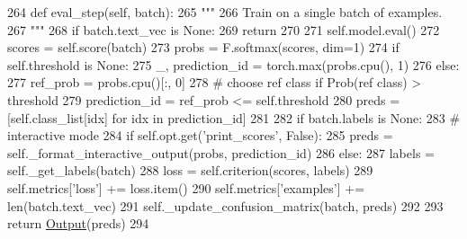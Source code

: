\begin{DoxyCode}
264     \textcolor{keyword}{def }eval\_step(self, batch):
265         \textcolor{stringliteral}{"""}
266 \textcolor{stringliteral}{        Train on a single batch of examples.}
267 \textcolor{stringliteral}{        """}
268         \textcolor{keywordflow}{if} batch.text\_vec \textcolor{keywordflow}{is} \textcolor{keywordtype}{None}:
269             \textcolor{keywordflow}{return}
270 
271         self.model.eval()
272         scores = self.score(batch)
273         probs = F.softmax(scores, dim=1)
274         \textcolor{keywordflow}{if} self.threshold \textcolor{keywordflow}{is} \textcolor{keywordtype}{None}:
275             \_, prediction\_id = torch.max(probs.cpu(), 1)
276         \textcolor{keywordflow}{else}:
277             ref\_prob = probs.cpu()[:, 0]
278             \textcolor{comment}{# choose ref class if Prob(ref class) > threshold}
279             prediction\_id = ref\_prob <= self.threshold
280         preds = [self.class\_list[idx] \textcolor{keywordflow}{for} idx \textcolor{keywordflow}{in} prediction\_id]
281 
282         \textcolor{keywordflow}{if} batch.labels \textcolor{keywordflow}{is} \textcolor{keywordtype}{None}:
283             \textcolor{comment}{# interactive mode}
284             \textcolor{keywordflow}{if} self.opt.get(\textcolor{stringliteral}{'print\_scores'}, \textcolor{keyword}{False}):
285                 preds = self.\_format\_interactive\_output(probs, prediction\_id)
286         \textcolor{keywordflow}{else}:
287             labels = self.\_get\_labels(batch)
288             loss = self.criterion(scores, labels)
289             self.metrics[\textcolor{stringliteral}{'loss'}] += loss.item()
290             self.metrics[\textcolor{stringliteral}{'examples'}] += len(batch.text\_vec)
291             self.\_update\_confusion\_matrix(batch, preds)
292 
293         \textcolor{keywordflow}{return} \hyperlink{namespaceparlai_1_1agents_1_1legacy__agents_1_1seq2seq_1_1torch__agent__v1_a2689006ea97d09413fb242f984bd8016}{Output}(preds)
294 
\end{DoxyCode}
\mbox{\label{classparlai_1_1core_1_1torch__classifier__agent_1_1TorchClassifierAgent_acf3aabdf7a98e434614c4da20c599df2}} 
